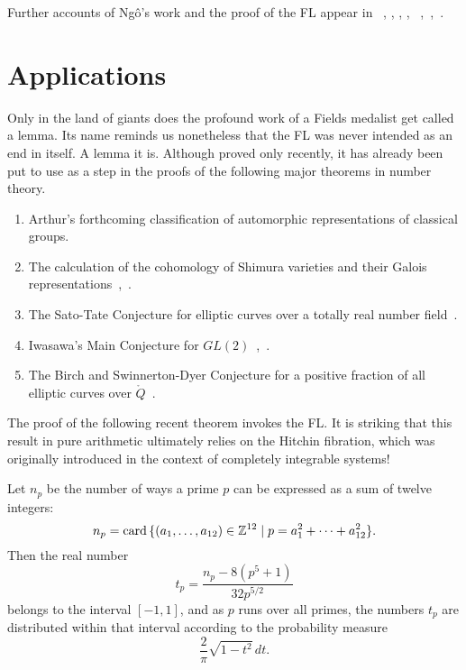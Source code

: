 Further accounts of Ng\^o's work and the proof of the FL appear in
~\cite{Nadler:2010}, \cite{Dat:2004}, \cite{Arthur:2010},
\cite{DN:2010},
~\cite{CHLaumon:2010},~\cite{Cass:2010},~\cite{NBC:report:2010}.




\section{Applications}

Only in the land of giants does the profound work of a Fields medalist get
called a lemma.  Its name reminds us nonetheless that the FL was never
intended as an end in itself.  A lemma it is.  Although proved only
recently, it has already been put to use as a step in the proofs of
the following major theorems in number theory.

\begin{enumerate}
\item Arthur's forthcoming classification of automorphic
  representations of classical groups.
\item The calculation of the cohomology of Shimura
  varieties and their Galois representations~\cite{Morel:2010},~\cite{Shin:2010}.
\item The Sato-Tate Conjecture for elliptic curves over a totally real
  number field~\cite{BGHT:2010}.
\item Iwasawa's Main Conjecture for $GL(2)$~\cite{Skinner-Urban:2010},~\cite{Skinner:2010}.
\item The Birch and Swinnerton-Dyer Conjecture  for a
positive fraction of all elliptic curves over $\ring{Q}$~\cite{BS:2010}.
\end{enumerate}

The proof of the following recent theorem invokes the FL.  
It is striking that this result in pure
arithmetic ultimately relies on the Hitchin fibration, which
was originally introduced in the context of completely integrable
systems!

\begin{thm} 
  Let $n_p$ be the number of ways a prime $p$ can be expressed as a
  sum of twelve integers:
\[
n_p = {\operatorname{card}}\,\{ (a_1,\ldots,a_{12})\in\mathbb{Z}^{12} \mid p = a_1^2 +\cdots +
  a_{12}^2 \}.
\]
Then the real number
\[
t_p = \frac{n_p -  8 (p^5 + 1)}{32 p^{5/2}}
\]
belongs to the interval $[-1,1]$, and as $p$ runs over all primes, the
numbers $t_p$ are distributed within that interval according to the probability
measure
\[
\frac{2}{\pi} \sqrt{1-t^2} \, dt.
\]
\end{thm}


